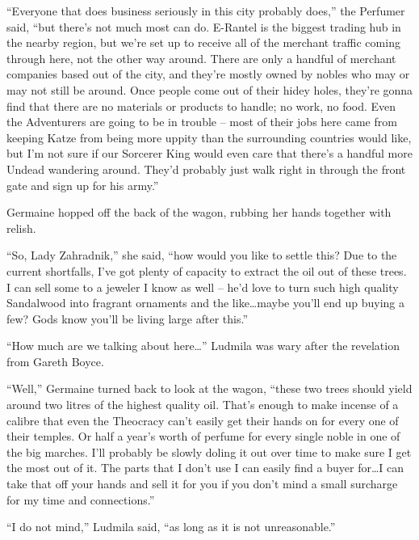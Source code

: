 “Everyone that does business seriously in this city probably does,” the Perfumer said, “but there’s not much most can do. E-Rantel is the biggest trading hub in the nearby region, but we’re set up to receive all of the merchant traffic coming through here, not the other way around. There are only a handful of merchant companies based out of the city, and they’re mostly owned by nobles who may or may not still be around. Once people come out of their hidey holes, they’re gonna find that there are no materials or products to handle; no work, no food. Even the Adventurers are going to be in trouble – most of their jobs here came from keeping Katze from being more uppity than the surrounding countries would like, but I’m not sure if our Sorcerer King would even care that there’s a handful more Undead wandering around. They’d probably just walk right in through the front gate and sign up for his army.”

 

Germaine hopped off the back of the wagon, rubbing her hands together with relish.

 

“So, Lady Zahradnik,” she said, “how would you like to settle this? Due to the current shortfalls, I’ve got plenty of capacity to extract the oil out of these trees. I can sell some to a jeweler I know as well – he’d love to turn such high quality Sandalwood into fragrant ornaments and the like…maybe you’ll end up buying a few? Gods know you’ll be living large after this.”

 

“How much are we talking about here…” Ludmila was wary after the revelation from Gareth Boyce.

 

“Well,” Germaine turned back to look at the wagon, “these two trees should yield around two litres of the highest quality oil. That’s enough to make incense of a calibre that even the Theocracy can’t easily get their hands on for every one of their temples. Or half a year’s worth of perfume for every single noble in one of the big marches. I’ll probably be slowly doling it out over time to make sure I get the most out of it. The parts that I don’t use I can easily find a buyer for…I can take that off your hands and sell it for you if you don’t mind a small surcharge for my time and connections.”

 

“I do not mind,” Ludmila said, “as long as it is not unreasonable.”

 

